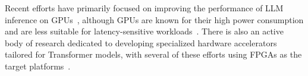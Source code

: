 Recent efforts have primarily focused on improving the performance of LLM inference on GPUs~\cite{aminabadi2022dsinf,fastertransformer2022}, although GPUs are known for their high power consumption and are less suitable for latency-sensitive workloads~\cite{kim2023survey,pope2022googleinf}. There is also an active body of research dedicated to developing specialized hardware accelerators tailored for Transformer models, with several of these efforts using FPGAs as the target platforms~\cite{hong2022dfx,liu2021fqbert,li2020ftrans,peng2021cbbp,hur2023flexrun,qi2021iccad}.



